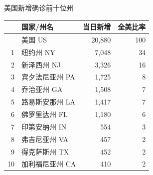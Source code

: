 \documentclass[
]{article}
\begin{document}
\begin{table}
      \centering
    \begin{minipage}{.45\linewidth}
    \caption{美国新增确诊前十位州}
    \vspace{-0.5\baselineskip}
      \centering
    \captionsetup{justification=centering} \begin{table}[H]
\centering\begingroup\fontsize{12}{14}\selectfont

\begin{tabular}{rlrr}
\toprule
  & 国家/州名 & 当日新增 & 全美比率\\
\midrule
\rowcolor{gray!6}   & 美国 US & 20,880 & 100\\
1 & 纽约州 NY & 7,048 & 34\\
\rowcolor{gray!6}  2 & 新泽西州 NJ & 3,326 & 16\\
3 & 宾夕法尼亚州 PA & 1,725 & 8\\
\rowcolor{gray!6}  4 & 乔治亚州 GA & 1,508 & 7\\
5 & 路易斯安那州 LA & 1,417 & 7\\
\rowcolor{gray!6}  6 & 佛罗里达州 FL & 1,180 & 6\\
7 & 印第安纳州 IN & 554 & 3\\
\rowcolor{gray!6}  8 & 弗吉尼亚州 VA & 457 & 2\\
9 & 得克萨斯州 TX & 452 & 2\\
\rowcolor{gray!6}  10 & 加利福尼亚州 CA & 410 & 2\\
\bottomrule
\end{tabular}
\endgroup{}
\end{table} \end{minipage}%
    \begin{minipage}{.45\linewidth}
     \caption{美国累计死亡前十位州}
     \vspace{-0.5\baselineskip}
      \centering
    \captionsetup{justification=centering} \begin{table}[H]
\centering\begingroup\fontsize{12}{14}\selectfont


\end{table}
\end{minipage}
\end{table}
\end{document}
